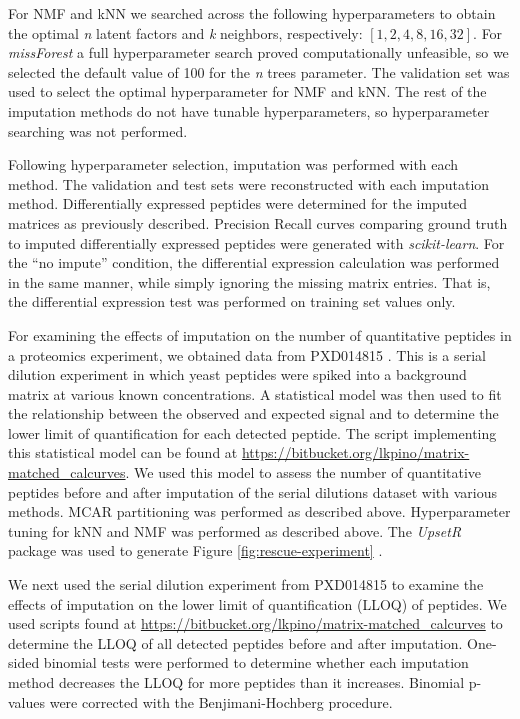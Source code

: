 \documentclass{article}
\begin{document}
For NMF and kNN we searched across the following hyperparameters to obtain the optimal \textit{n} latent factors and \textit{k} neighbors, respectively: $[1,2,4,8,16,32]$. For \textit{missForest} a full hyperparameter search proved computationally unfeasible, so we selected the default value of 100 for the \textit{n} trees parameter. The validation set was used to select the optimal hyperparameter for NMF and kNN. The rest of the imputation methods do not have tunable hyperparameters, so hyperparameter searching was not performed. 

Following hyperparameter selection, imputation was performed with each method. The validation and test sets were reconstructed with each imputation method. Differentially expressed peptides were determined for the imputed matrices as previously described. Precision Recall curves comparing ground truth to imputed differentially expressed peptides were generated with \textit{scikit-learn}. For the ``no impute'' condition, the differential expression calculation was performed in the same manner, while simply ignoring the missing matrix entries. That is, the differential expression test was performed on training set values only. 

For examining the effects of imputation on the number of quantitative peptides in a proteomics experiment, we obtained data from PXD014815 \cite{matrix-matched-calib}. This is a serial dilution experiment in which yeast peptides were spiked into a background matrix at various known concentrations. A statistical model was then used to fit the relationship between the observed and expected signal and to determine the lower limit of quantification for each detected peptide. The script implementing this statistical model can be found at \url{https://bitbucket.org/lkpino/matrix-matched_calcurves}. We used this model to assess the number of quantitative peptides before and after imputation of the serial dilutions dataset with various methods. MCAR partitioning was performed as described above. Hyperparameter tuning for kNN and NMF was performed as described above. The \textit{UpsetR} package was used to generate Figure \ref{fig:rescue-experiment} \cite{UpsetR}.

We next used the serial dilution experiment from PXD014815 to examine the effects of imputation on the lower limit of quantification (LLOQ) of peptides. We used scripts found at \url{https://bitbucket.org/lkpino/matrix-matched_calcurves} to determine the LLOQ of all detected peptides before and after imputation. One-sided binomial tests were performed to determine whether each imputation method decreases the LLOQ for more peptides than it increases. Binomial p-values were corrected with the Benjimani-Hochberg procedure. 
\end{document}
